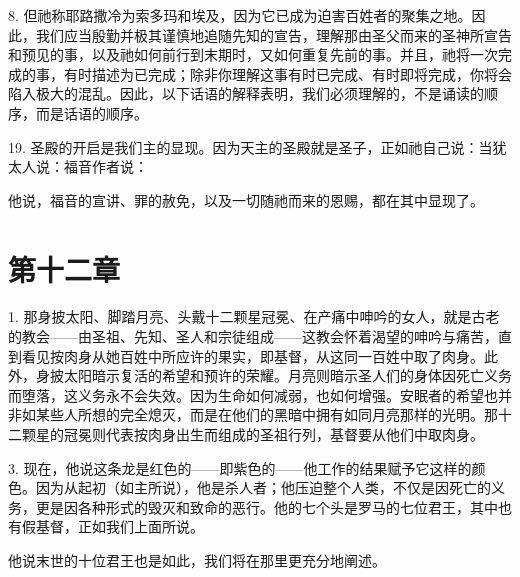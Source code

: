 8. 但祂称耶路撒冷为索多玛和埃及，因为它已成为迫害百姓者的聚集之地。因此，我们应当殷勤并极其谨慎地追随先知的宣告，理解那由圣父而来的圣神所宣告和预见的事，以及祂如何前行到末期时，又如何重复先前的事。并且，祂将一次完成的事，有时描述为已完成；除非你理解这事有时已完成、有时即将完成，你将会陷入极大的混乱。因此，以下话语的解释表明，我们必须理解的，不是诵读的顺序，而是话语的顺序。\par

19. 圣殿的开启是我们主的显现。因为天主的圣殿就是圣子，正如祂自己说：当犹太人说：福音作者说：\par

他说，福音的宣讲、罪的赦免，以及一切随祂而来的恩赐，都在其中显现了。\par


\section{第十二章}

1. 那身披太阳、脚踏月亮、头戴十二颗星冠冕、在产痛中呻吟的女人，就是古老的教会——由圣祖、先知、圣人和宗徒组成——这教会怀着渴望的呻吟与痛苦，直到看见按肉身从她百姓中所应许的果实，即基督，从这同一百姓中取了肉身。此外，身披太阳暗示复活的希望和预许的荣耀。月亮则暗示圣人们的身体因死亡义务而堕落，这义务永不会失效。因为生命如何减弱，也如何增强。安眠者的希望也并非如某些人所想的完全熄灭，而是在他们的黑暗中拥有如同月亮那样的光明。那十二颗星的冠冕则代表按肉身出生而组成的圣祖行列，基督要从他们中取肉身。\par

3.  现在，他说这条龙是红色的——即紫色的——他工作的结果赋予它这样的颜色。因为从起初（如主所说），他是杀人者；他压迫整个人类，不仅是因死亡的义务，更是因各种形式的毁灭和致命的恶行。他的七个头是罗马的七位君王，其中也有假基督，正如我们上面所说。\par

 他说末世的十位君王也是如此，我们将在那里更充分地阐述。\par

